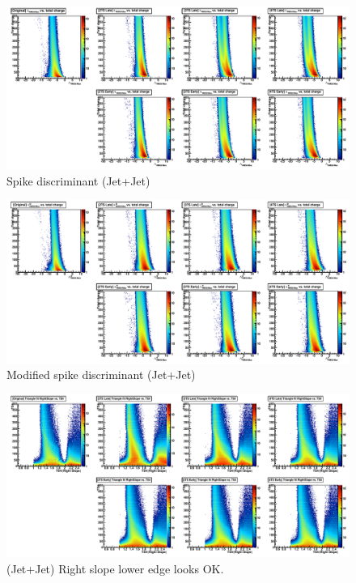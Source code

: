 \begin{figure}
   \includegraphics[width=120mm]{DailyLog/6411/6411_MixJetOnJetLambdaRMS8Max.pdf}
   \caption{Spike discriminant (Jet+Jet)}
   \label{Figure_6411_MixJetOnJetLambdaRMS8Max}
\end{figure}
\begin{figure}
   \includegraphics[width=120mm]{DailyLog/6411/6411_MixJetOnJetLambdaDRMS8Max.pdf}
   \caption{Modified spike discriminant (Jet+Jet)}
   \label{Figure_6411_MixJetOnJetLambdaDRMS8Max}
\end{figure}

\begin{figure}
   \includegraphics[width=120mm]{DailyLog/6411/6411_MixJetOnJetRightSlopeZoomIn.pdf}
   \caption{(Jet+Jet)  Right slope lower edge looks OK.}
   \label{Figure_6411_MixJetOnJetRightSlopeZoomIn}
\end{figure}

